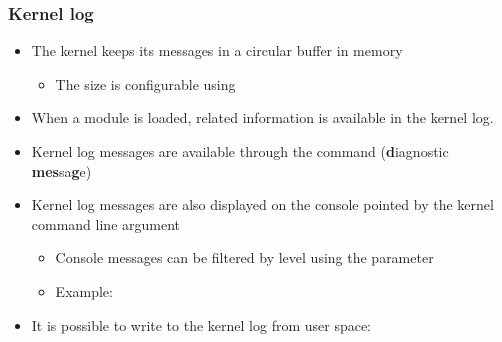 \begin{frame}
  \frametitle{Kernel log}
  \begin{itemize}
  \item The kernel keeps its messages in a circular buffer in memory
    \begin{itemize}
    \item The size is configurable using 
    \end{itemize}
  \item When a module is loaded, related information is available in the
    kernel log.
  \item Kernel log messages are available through the 
    command ({\bf d}iagnostic {\bf mes}sa{\bf g}e)
  \item Kernel log messages are also displayed on the console pointed by
    the  kernel command line argument
    \begin{itemize}
    \item Console messages can be filtered by level using the
       parameter
    \item Example: 
    \end{itemize}
  \item It is possible to write to the kernel log from user space:
  \end{itemize}
\end{frame}
